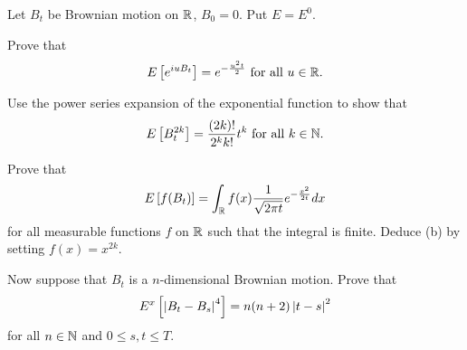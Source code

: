 \begin{exercise}{2.8}
    Let $B_t$ be Brownian motion on $\mathbb{R}$, $B_0 = 0$. Put $E = E^0$. 
    \begin{thmenum}
        \item Prove that 
        \begin{equation*}
            E\left[ {e^{iuB_t}} \right] = e^{-\frac{u^2t}{2}} \text{ for all } u\in\mathbb{R}.
        \end{equation*}
        \item Use the power series expansion of the exponential function to show that
        \begin{equation*}
            E\left[ {B_t^{2k}} \right] = \frac{(2k)!}{2^k k!} t^k \text{ for all } k\in\mathbb{N}.
        \end{equation*}
        \item Prove that 
        \begin{equation*}
            E\left[ {f(B_t)} \right] = \int_{\mathbb{R}} f(x) \frac{1}{\sqrt{2\pi t}} e^{-\frac{x^2}{2t}} dx
        \end{equation*}
        for all measurable functions $f$ on $\mathbb{R}$ such that the integral is finite. Deduce (b) by 
        setting $f(x) = x^{2k}$.
        \item Now suppose that $B_t$ is a $n$-dimensional Brownian motion. Prove that 
        \begin{equation*}
            E^x\left[ {\left\lvert {B_t - B_s} \right\rvert^4} \right] = n(n+2)\left\lvert {t-s} \right\rvert^2
        \end{equation*}
        for all $n\in\mathbb{N}$ and $0\leq s,t\leq T$.
    \end{thmenum}
\end{exercise}

